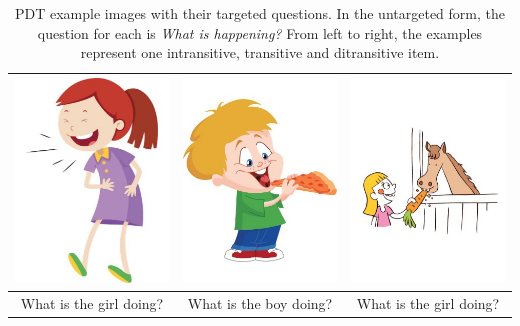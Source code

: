 \begin{table}[htb!]
\begin{center}
\begin{tabular}{|c|c|c|}
\hline
{\includegraphics[width=0.29\columnwidth]{figures/I20.jpg}} & {\includegraphics[width=0.3\columnwidth]{figures/I02.jpg}} & {\includegraphics[width=0.3\columnwidth]{figures/I17.jpg}} \\
\hline
What is the girl doing? & What is the boy doing? & What is the girl doing? \\
\hline
\end{tabular}
\caption{\label{tab:example-pdt-items} PDT example images with their targeted questions. In the untargeted form, the question for each is \textit{What is happening?} From left to right, the examples represent one intransitive, transitive and ditransitive item.}
\end{center}
\end{table}


